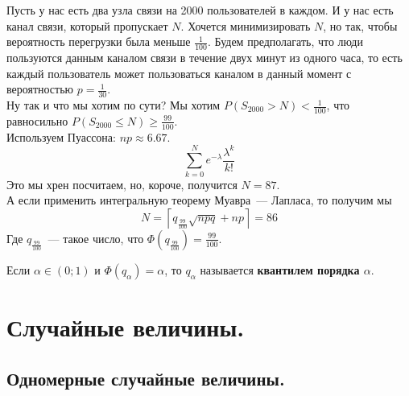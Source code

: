 \documentclass{article}
\begin{document}
    \begin{example}
        Пусть у нас есть два узла связи на 2000 пользователей в каждом. И у нас есть канал связи, который пропускает $N$. Хочется минимизировать $N$, но так, чтобы вероятность перегрузки была меньше $\frac1{100}$. Будем предполагать, что люди пользуются данным каналом связи в течение двух минут из одного часа, то есть каждый пользователь может пользоваться каналом в данный момент с вероятностью $p=\frac1{30}$.\\
        Ну так и что мы хотим по сути? Мы хотим $P(S_{2000}>N)<\frac1{100}$, что равносильно $P(S_{2000}\leqslant N)\geqslant\frac{99}{100}$.\\
        Используем Пуассона: $np\approx 6.67$.
        $$
        \sum\limits_{k=0}^Ne^{-\lambda}\frac{\lambda^k}{k!}
        $$
        Это мы хрен посчитаем, но, короче, получится $N=87$.\\
        А если применить интегральную теорему Муавра~--- Лапласа, то получим мы
        $$
        N=\left\lceil q_{\frac{99}{100}}\sqrt{npq}+np\right\rceil=86
        $$
        Где $q_{\frac{99}{100}}$~--- такое число, что $\Phi(q_{\frac{99}{100}})=\frac{99}{100}$.
    \end{example}
    \begin{definition}
        Если $\alpha\in(0;1)$ и $\Phi(q_\alpha)=\alpha$, то $q_\alpha$ называется \textbf{квантилем порядка $\alpha$}.
    \end{definition}
    \section{Случайные величины.}
    \subsection{Одномерные случайные величины.}
\end{document}
